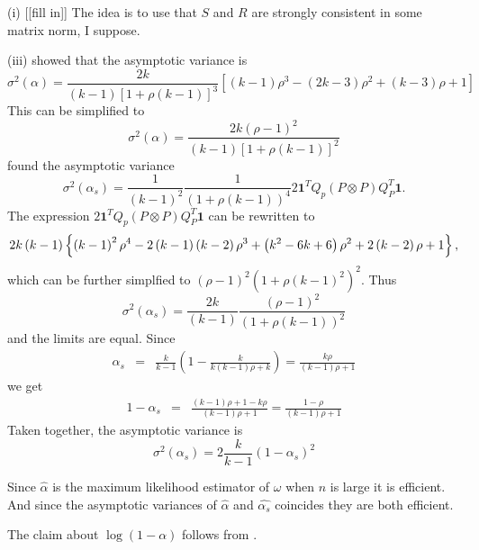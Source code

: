 \documentclass{article}
\makeatletter
\theoremstyle{plain}
\theoremstyle{plain}
\theoremstyle{definition}
\theoremstyle{remark}
\theoremstyle{definition}
\theoremstyle{plain}
\theoremstyle{plain}
\theoremstyle{definition}
\newenvironment{proof}[1][\protect\proofname]{\par
	\normalfont\topsep6\p@\@plus6\p@\relax
	\trivlist
	\itemindent\parindent
	\item[\hskip\labelsep\scshape #1]\ignorespaces
}{%
	\endtrivlist\@endpefalse
}
\providecommand{\proofname}{Proof}
\makeatother
\begin{document}
\begin{proof}[Proof of Theorem \ref{thm:asymptotics}]\label{proof:asymptotics}
(i) [[fill in]] The idea is to use that $S$ and $R$ are strongly consistent in some matrix norm, I suppose. 

(iii) \citet[eq. 22]{Van_Zyl2000-si} showed that the asymptotic variance
is
\[
\sigma^{2}\left(\alpha\right)=\frac{2k}{\left(k-1\right)\left[1+\rho\left(k-1\right)\right]^{3}}\left[\left(k-1\right)\rho^{3}-\left(2k-3\right)\rho^{2}+\left(k-3\right)\rho+1\right]
\]
This can be simplified to
\[
\sigma^{2}\left(\alpha\right)=\frac{2k\left(\rho-1\right)^{2}}{\left(k-1\right)\left[1+\rho\left(k-1\right)\right]^{2}}
\]
\citet[equation 10]{hayashi2005note} found the asymptotic variance
\[
\sigma^{2}\left(\alpha_{s}\right)=\frac{1}{\left(k-1\right)^{2}}\frac{1}{\left(1+\rho\left(k-1\right)\right)^{4}}2\mathbf{1}^{T}Q_{p}\left(P\otimes P\right)Q_{P}^{T}\mathbf{1}.
\]
The expression $2\mathbf{1}^{T}Q_{p}\left(P\otimes P\right)Q_{P}^{T}\mathbf{1}$
can be rewritten to \citep[appendix 3]{hayashi2005note}
\[
2k\left(k-1\right)\left\{ \left(k-1\right)^{2}\rho^{4}-2\left(k-1\right)\left(k-2\right)\rho^{3}+\left(k^{2}-6k+6\right)\text{\ensuremath{\rho^{2}+2\left(k-2\right)\rho+1}}\right\} ,
\]
which can be further simplfied to $\left(\rho-1\right)^{2}\left(1+\rho\left(k-1\right)^{2}\right)^{2}$.
Thus
\[
\sigma^{2}\left(\alpha_{s}\right)=\frac{2k}{\left(k-1\right)}\frac{\left(\rho-1\right)^{2}}{\left(1+\rho\left(k-1\right)\right)^{2}}
\]
and the limits are equal.
Since
\begin{eqnarray*}
\alpha_{s} & = & \frac{k}{k-1}\left(1-\frac{k}{k\left(k-1\right)\rho+k}\right) = \frac{k\rho}{\left(k-1\right)\rho+1}
\end{eqnarray*}
we get
\begin{eqnarray*}
1-\alpha_{s} & = & \frac{\left(k-1\right)\rho+1-k\rho}{\left(k-1\right)\rho+1} = \frac{1-\rho}{\left(k-1\right)\rho+1}
\end{eqnarray*}
Taken together, the asymptotic variance is
\[
\sigma^{2}\left(\alpha_{s}\right)=2\frac{k}{k-1}\left(1-\alpha_{s}\right)^{2}
\]

Since $\widehat{\alpha}$ is the maximum likelihood estimator of $\omega$
when $n$ is large it is efficient. And since the asymptotic variances
of $\widehat{\alpha}$ and $\widehat{\alpha_{s}}$ coincides they
are both efficient.

The claim about $\log\left(1-\alpha\right)$ follows from \citep[eq. 14]{Van_Zyl2000-si}.
\end{proof}
\end{document}
